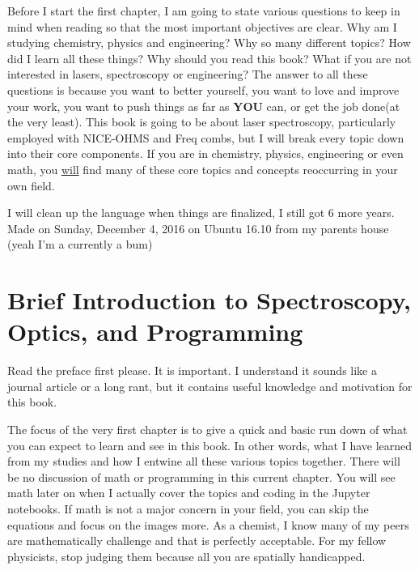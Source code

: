 \documentclass[a4paper]{book}
\begin{document}
	Before I start the first chapter, I am going to state various questions to keep in mind when reading so that the most important objectives are clear. Why am I studying chemistry, physics and engineering? Why so many different topics? How did I learn all these things? Why should you read this book? What if you are not interested in lasers, spectroscopy or engineering? The answer to all these questions is because you want to better yourself, you want to love and improve your work, you want to push things as far as {\bfseries YOU} can, or get the job done(at the very least). This book is going to be about laser spectroscopy, particularly employed with NICE-OHMS and Freq combs, but I will break every topic down into their core components. If you are in chemistry, physics, engineering or even math, you {\underline{will}} find many of these core topics and concepts reoccurring in your own field.
	
	I will clean up the language when things are finalized, I still got 6 more years. Made on Sunday, December 4, 2016 on Ubuntu 16.10 from my parents house (yeah I'm a currently a bum)
	
\mainmatter
\chapter{Brief Introduction to Spectroscopy, Optics, and Programming}
	\label{chp:BriefIntroduction}
	Read the preface first please. It is important. I understand it sounds like a journal article or a long rant, but it contains useful knowledge and motivation for this book.
	
	The focus of the very first chapter is to give a quick and basic run down of what you can expect to learn and see in this book. In other words, what I have learned from my studies and how I entwine all these various topics together. There will be no discussion of math or programming in this current chapter. You will see math later on when I actually cover the topics and coding in the Jupyter notebooks. If math is not a major concern in your field, you can skip the equations and focus on the images more. As a chemist, I know many of my peers are mathematically challenge and that is perfectly acceptable. For my fellow physicists, stop judging them because all you are spatially handicapped. 
	
\end{document}
